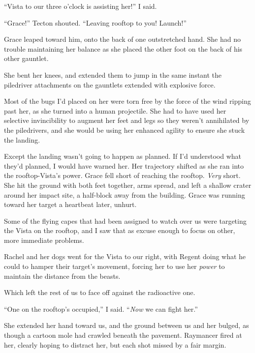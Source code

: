 ``Vista to our three o'clock is assisting her!'' I said.



``Grace!'' Tecton shouted.  ``Leaving rooftop to you!  Launch!''



Grace leaped toward him, onto the back of one outstretched hand.  She had no trouble maintaining her balance as she placed the other foot on the back of his other gauntlet.



She bent her knees, and extended them to jump in the same instant the piledriver attachments on the gauntlets extended with explosive force.



Most of the bugs I'd placed on her were torn free by the force of the wind ripping past her, as she turned into a human projectile.  She had to have used her selective invincibility to augment her feet and legs so they weren't annihilated by the piledrivers, and she would be using her enhanced agility to ensure she stuck the landing.



Except the landing wasn't going to happen as planned.  If I'd understood what they'd planned, I would have warned her.  Her trajectory shifted as she ran into the rooftop-Vista's power.  Grace fell short of reaching the rooftop.  \emph{Very} short.  She hit the ground with both feet together, arms spread, and left a shallow crater around her impact site, a half-block away from the building.  Grace was running toward her target a heartbeat later, unhurt.



Some of the flying capes that had been assigned to watch over us were targeting the Vista on the rooftop, and I saw that as excuse enough to focus on other, more immediate problems.



Rachel and her dogs went for the Vista to our right, with Regent doing what he could to hamper their target's movement, forcing her to use her \emph{power} to maintain the distance from the beasts.



Which left the rest of us to face off against the radioactive one.



``One on the rooftop's occupied,'' I said.  ``\emph{Now} we can fight her.''



She extended her hand toward us, and the ground between us and her bulged, as though a cartoon mole had crawled beneath the pavement.  Raymancer fired at her, clearly hoping to distract her, but each shot missed by a fair margin.



